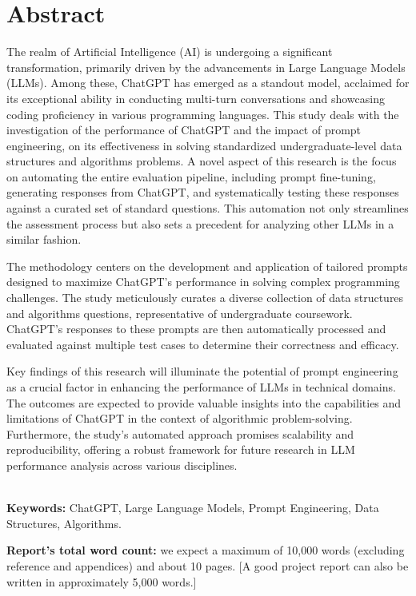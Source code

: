 \chapter*{\center \Large  Abstract}

The realm of Artificial Intelligence (AI) is undergoing a significant transformation, primarily driven by the advancements in Large Language Models (LLMs). Among these, ChatGPT has emerged as a standout model, acclaimed for its exceptional ability in conducting multi-turn conversations and showcasing coding proficiency in various programming languages. This study deals with the investigation of the performance of ChatGPT and the impact of prompt engineering, on its effectiveness in solving standardized undergraduate-level data structures and algorithms problems. A novel aspect of this research is the focus on automating the entire evaluation pipeline, including prompt fine-tuning, generating responses from ChatGPT, and systematically testing these responses against a curated set of standard questions. This automation not only streamlines the assessment process but also sets a precedent for analyzing other LLMs in a similar fashion.

The methodology centers on the development and application of tailored prompts designed to maximize ChatGPT's performance in solving complex programming challenges. The study meticulously curates a diverse collection of data structures and algorithms questions, representative of undergraduate coursework. ChatGPT's responses to these prompts are then automatically processed and evaluated against multiple test cases to determine their correctness and efficacy.

Key findings of this research will illuminate the potential of prompt engineering as a crucial factor in enhancing the performance of LLMs in technical domains. The outcomes are expected to provide valuable insights into the capabilities and limitations of ChatGPT in the context of algorithmic problem-solving. Furthermore, the study's automated approach promises scalability and reproducibility, offering a robust framework for future research in LLM performance analysis across various disciplines.


~\\[1cm]
\noindent %
\textbf{Keywords:} ChatGPT, Large Language Models, Prompt Engineering, Data Structures, Algorithms.

\vfill
\noindent
\textbf{Report's total word count:} we expect a maximum of 10,000 words (excluding reference and appendices) and about 10 pages. [A good project report can also be written in approximately 5,000 words.]

